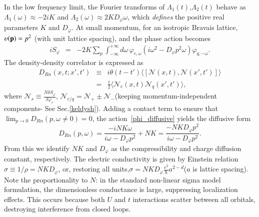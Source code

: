 \documentclass[twocolumn,floatfix,superscriptaddress]{revtex4-1}
\newcommand{\ket}{\rangle}
\newcommand{\bra}{\langle}
\begin{document}
In the low frequency limit, the Fourier transforms of  $\Lambda_1(t)$,$\Lambda_2(t)$ behave as $\Lambda_1(\omega)\approx -2iK$ and $\Lambda_2(\omega)\approx 2KD_{\varphi} \omega$, which {\em defines} the positive real parameters $K$ and $D_\varphi$.  At small momentum, for an isotropic Bravais lattice, $\upsilon ({\bf p})=p^2$ (with unit lattice spacing), and the phase action becomes
\begin{eqnarray}
\label{phi_diffusive}
iS_{\varphi}&=& -2K\sum_p\int_{-\infty}^{+\infty} \!\!\! d\omega\,  \varphi_{c,\omega}(i\omega^2-D_{\varphi}p^2\omega)\varphi_{q,-\omega} .
\end{eqnarray}
The density-density correlator is expressed as
\begin{eqnarray}
\label{re_NN}
D_{Rn}(x,\!t;x'\!,\!t')&\equiv& i\theta(t-t')\bra[\mathcal N(x,\!t),\mathcal N(x'\!,\!t')]\ket\nonumber\\
&=&\frac{i}{2}\bra \mathcal N_c(x,\!t)\mathcal N_q(x'\!,\!t')\ket,
\end{eqnarray}
where  $\mathcal N_s\equiv\frac{N\delta S_\varphi}{\delta \dot\varphi_s}$, $\mathcal N_{c/q}=\mathcal N_+\pm \mathcal N_-$(keeping momentum-independent components- See Sec.\ref{keldysh}). Adding a contact term to ensure that $\lim_{p\rightarrow 0} D_{Rn}(p,\omega\neq 0)=0$\cite{policastro_2002}, the action~\eqref{phi_diffusive} yields the diffusive form \cite{kadanoff_martin}
\begin{equation}
\label{dr_form}
D_{Rn}(p,\omega)=\frac{-iNK\omega}{i\omega-D_\varphi p^2}+NK=\frac{-NKD_{\varphi}p^2}{i\omega-D_{\varphi}p^2}.
\end{equation}
From this we identify $N K$ and $D_{\varphi}$ as the compressibility and charge diffusion constant, respectively.  %
The electric conductivity is given by Einstein relation $\sigma\equiv 1/\rho=NKD_{\varphi}$, or, restoring all units,$\sigma = NK D_\varphi \frac{e^2}{\hbar}a^{2-d}$($a$ is lattice spacing).  Note the proportionality to $N$: in the standard non-linear sigma model formulation, the dimensionless conductance is large,  suppressing localization effects.  This occurs because both $U$ and $t$ interactions scatter between all orbitals,  destroying interference from closed loops.
\end{document}
